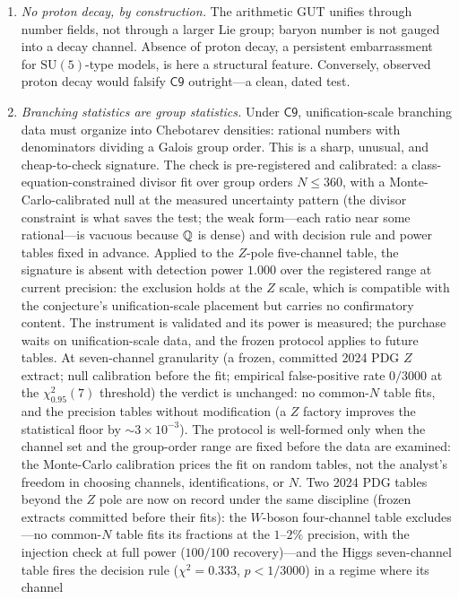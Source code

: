 \begin{enumerate}[leftmargin=1.6em]
\item \emph{No proton decay, by construction.} The arithmetic GUT unifies through number
fields, not through a larger Lie group; baryon number is not gauged into a decay channel.
Absence of proton decay, a persistent embarrassment for $\mathrm{SU}(5)$-type models, is
here a structural feature. Conversely, observed proton decay would falsify
$\mathsf{C9}$ outright---a clean, dated test.
\item \emph{Branching statistics are group statistics.} Under $\mathsf{C9}$, unification-scale
branching data must organize into Chebotarev densities: rational numbers with denominators
dividing a Galois group order. This is a sharp, unusual, and cheap-to-check signature. The
check is pre-registered and calibrated: a class-equation-constrained divisor fit over
group orders $N\leq360$, with a Monte-Carlo-calibrated null at the measured uncertainty
pattern (the divisor constraint is what saves the test; the weak
form---each ratio near some rational---is vacuous because $\mathbb{Q}$ is dense) and with decision
rule and power tables fixed in advance. Applied to the $Z$-pole five-channel table, the
signature is absent with detection power $1.000$ over the registered range at current
precision: the exclusion holds at the $Z$ scale, which is compatible with the conjecture's
unification-scale placement but carries no confirmatory content. The instrument is
validated and its power is measured; the
purchase waits on unification-scale data, and the frozen protocol applies to future
tables. At seven-channel granularity (a frozen, committed 2024 PDG $Z$ extract; null
calibration before the fit; empirical false-positive rate $0/3000$ at the
$\chi^{2}_{0.95}(7)$ threshold) the verdict is unchanged: no common-$N$ table fits, and
the
precision tables without modification (a $Z$ factory improves the statistical floor by
$\sim3\times10^{-3}$). The protocol is well-formed only when the channel
set and the group-order range are fixed before the data are examined: the Monte-Carlo
calibration prices the fit on random tables, not the analyst's freedom in choosing channels,
identifications, or $N$. Two 2024 PDG tables beyond the $Z$ pole are now on record under the
same discipline (frozen extracts committed before their fits): the $W$-boson four-channel
table excludes---no common-$N$ table fits its fractions at the $1$--$2\%$ precision, with
the injection check at full power ($100/100$ recovery)---and the Higgs seven-channel table
fires the decision rule ($\chi^{2}=0.333$, $p<1/3000$) in a regime where its channel

\end{enumerate}

